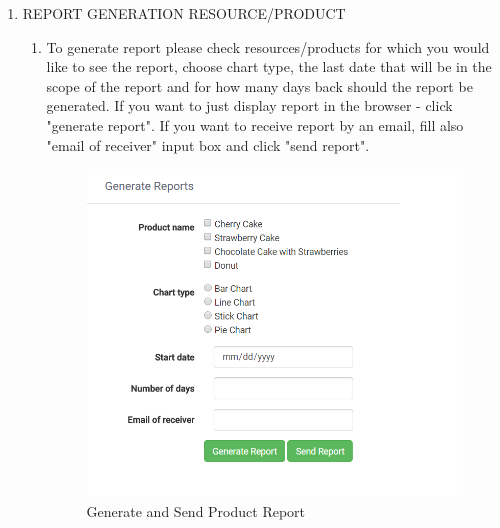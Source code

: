 \documentclass[a4paper,11pt,twoside]{report}
\theoremstyle{definition}
\begin{document}
\begin{enumerate}
\begin{enumerate}
\end{enumerate}

\item REPORT GENERATION RESOURCE/PRODUCT
\begin{enumerate}
\item To generate report please check resources/products for which you would like to see the report, choose chart  type,  the last date that will be in the scope of the report and for how many days back should the report be generated. If you want to just display report in the browser - click "generate report". If you want to receive report by an email, fill also "email of receiver" input box and click "send report".

\begin{figure}[h!]
\begin{center}
\includegraphics[width=\textwidth]{AS/report/1}
\end{center}
\caption{Generate and Send Product Report}
\end{figure}
\thispagestyle{empty}


\end{enumerate}
\end{enumerate}
\end{document}
